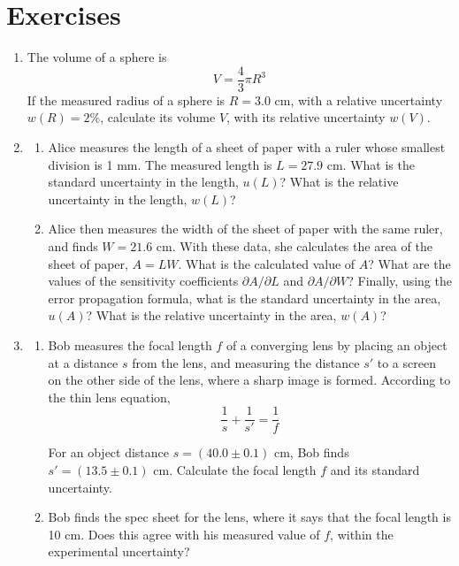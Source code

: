 \documentclass[justified]{tufte-handout}
\begin{document}
\section*{Exercises}
\begin{enumerate}
\item
The volume of a sphere is 
\begin{equation*}
V=\frac{4}{3}\pi R^3
\end{equation*}
If the measured radius of a sphere is $R=3.0$ cm, with a relative uncertainty $w(R)=2$\%, calculate its volume $V$, with its relative uncertainty $w(V)$.

\item
\begin{enumerate}
\item
Alice measures the length of a sheet of paper with a ruler whose smallest division is 1 mm. The measured length is $L=27.9$ cm. What is the standard uncertainty in the length, $u(L)$? What is the relative uncertainty in the length, $w(L)$?
\item
Alice then measures the width of the sheet of paper with the same ruler, and finds $W=21.6$ cm. With these data, she calculates the area of the sheet of paper, $A=LW$. What is the calculated value of $A$? What are the values of the sensitivity coefficients $\partial A/\partial L$ and $\partial A/\partial W$? Finally, using the error propagation formula, what is the standard uncertainty in the area, $u(A)$? What is the relative uncertainty in the area, $w(A)$?
\end{enumerate}


\item
\begin{enumerate}
\item
Bob measures the focal length $f$ of a converging lens by placing an object at a distance $s$ from the lens, and measuring the distance $s'$ to a screen on the other side of the lens, where a sharp image is formed. According to the thin lens equation, 
\begin{equation*}
\frac{1}{s}+\frac{1}{s'}=\frac{1}{f}
\end{equation*}

For an object distance $s=(40.0\pm 0.1)$ cm, Bob finds $s'=(13.5\pm 0.1)$ cm. Calculate the focal length $f$ and its standard uncertainty. 
\item
Bob finds the spec sheet for the lens, where it says that the focal length is 10 cm. Does this agree with his measured value of $f$, within the experimental uncertainty?
\end{enumerate}
\end{enumerate}
\end{document}
